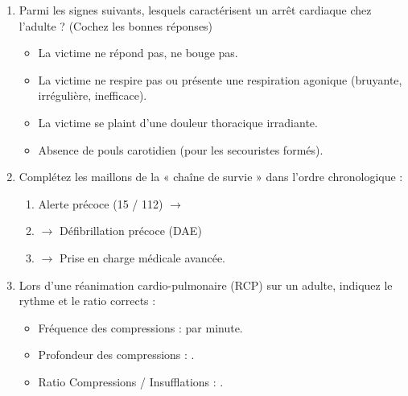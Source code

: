 \documentclass[11pt]{article}
\begin{document}
\begin{exercice}
\begin{enumerate}
    \item Parmi les signes suivants, lesquels caractérisent un arrêt cardiaque chez l'adulte ? (Cochez les bonnes réponses)
    \begin{itemize}
        \item[] La victime ne répond pas, ne bouge pas.
        \item[] La victime ne respire pas ou présente une respiration agonique (bruyante, irrégulière, inefficace).
        \item[] La victime se plaint d'une douleur thoracique irradiante.
        \item[] Absence de pouls carotidien (pour les secouristes formés).
    \end{itemize}
    \item Complétez les maillons de la « chaîne de survie » dans l'ordre chronologique :
\begin{enumerate}
        \item Alerte précoce (15 / 112) $\rightarrow$ \underline{\hspace{5cm}}
        \item \underline{\hspace{5cm}} $\rightarrow$ Défibrillation précoce (DAE)
        \item \underline{\hspace{5cm}} $\rightarrow$ Prise en charge médicale avancée.
    \end{enumerate}
    \item Lors d'une réanimation cardio-pulmonaire (RCP) sur un adulte, indiquez le rythme et le ratio corrects :
    \begin{itemize}
        \item Fréquence des compressions : \underline{\hspace{3cm}} par minute.
        \item Profondeur des compressions : \underline{\hspace{3cm}}.
        \item Ratio Compressions / Insufflations : \underline{\hspace{2cm}}.
    \end{itemize}
\end{enumerate}
\end{exercice}
\end{document}
